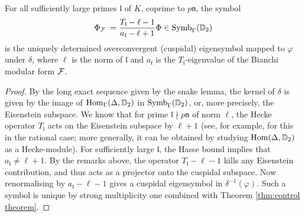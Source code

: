 \documentclass[a4paper,11pt]{article}
\numberwithin{equation}{section}
\newcommand{\fn}{\mathfrak{n}}
\begin{document}
\begin{proposition}
	For all sufficiently large primes $\mathfrak{l}$ of $K$, coprime to $p\fn$, the symbol
	\[
		\Phi_{\f} \defeq \frac{T_{\mathfrak{l}} - \ell - 1}{a_{\mathfrak{l}} - \ell + 1} \Phi \in \Symb_\Gamma(\D_2)
	\] 
	is the uniquely determined overconvergent (cuspidal) eigensymbol mapped to $\varphi$ under $\delta$, where $\ell$ is the norm of $\mathfrak{l}$ and $a_{\mathfrak{l}}$ is the $T_{\mathfrak{l}}$-eigenvalue of the Bianchi modular form $\mathcal{F}$.
\end{proposition}
\begin{proof}
By the long exact sequence given by the snake lemma, the kernel of $\delta$ is given by the image of $\mathrm{Hom}_\Gamma(\Delta,\mathbb{D}_2)$ in $\mathrm{Symb}_\Gamma(\mathbb{D}_2)$, or, more precisely, the Eisenstein subspace. We know that for prime $\mathfrak{l}\nmid p\fn$ of norm $\ell$, the Hecke operator $T_{\mathfrak{l}}$ acts on the Eisenstein subspace by $\ell + 1$ (see, for example, \cite[Rem.~5.2]{PS11} for this in the rational case; more generally, it can be obtained by studying $\mathrm{Hom}(\Delta,\mathbb{D}_2)$ as a Hecke-module). For sufficiently large $\mathfrak{l}$, the Hasse bound implies that $a_{\mathfrak{l}} \neq \ell + 1$. By the remarks above, the operator $T_{\mathfrak{l}} - \ell -1$ kills any Eisenstein contribution, and thus acts as a projector onto the cuspidal subspace. Now renormalising by $a_{\mathfrak{l}} - \ell - 1$ gives a cuspidal eigensymbol in $\delta^{-1}(\varphi)$. Such a symbol is unique by strong multiplicity one combined with Theorem \ref{thm:control theorem}.
\end{proof}
\end{document}
